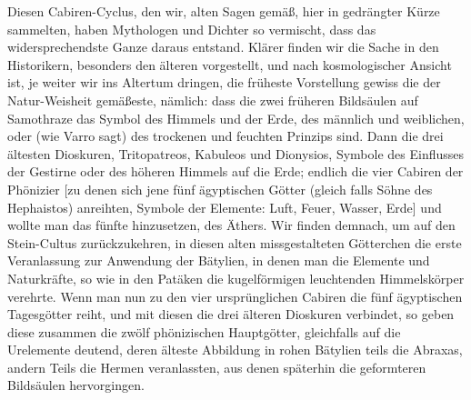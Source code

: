\documentclass[a4paper, 11pt, oneside, polutonikogreek, german]{article}
\begin{document}
Diesen Cabiren-Cyclus, den wir, alten Sagen gemäß, hier in gedrängter Kürze sammelten, haben Mythologen und Dichter so vermischt, dass das widersprechendste Ganze daraus entstand. Klärer finden wir die Sache in den Historikern, besonders den älteren vorgestellt, und nach kosmologischer Ansicht ist, je weiter wir ins Altertum dringen, die früheste Vorstellung gewiss die der Natur-Weisheit gemäßeste, nämlich: dass die zwei früheren Bildsäulen auf Samothraze das Symbol des Himmels und der Erde, des männlich und weiblichen, oder (wie Varro sagt) des trockenen und feuchten Prinzips sind. Dann die drei ältesten Dioskuren, Tritopatreos, Kabuleos und Dionysios, Symbole des Einflusses der Gestirne oder des höheren Himmels auf die Erde; endlich die vier Cabiren der Phönizier [zu denen sich jene fünf ägyptischen Götter (gleich falls Söhne des Hephaistos) anreihten, Symbole der Elemente: Luft, Feuer, Wasser, Erde] und wollte man das fünfte hinzusetzen, des Äthers. Wir finden demnach, um auf den Stein-Cultus zurückzukehren, in diesen alten missgestalteten Götterchen die erste Veranlassung zur Anwendung der Bätylien, in denen man die Elemente und Naturkräfte, so wie in den Patäken die kugelförmigen leuchtenden Himmelskörper verehrte. Wenn man nun zu den vier ursprünglichen Cabiren die fünf ägyptischen Tagesgötter reiht, und mit diesen die drei älteren Dioskuren verbindet, so geben diese zusammen die zwölf phönizischen Hauptgötter, gleichfalls auf die Urelemente deutend, deren älteste Abbildung in rohen Bätylien teils die Abraxas, andern Teils die Hermen veranlassten, aus denen späterhin die geformteren Bildsäulen hervorgingen.
\end{document}
